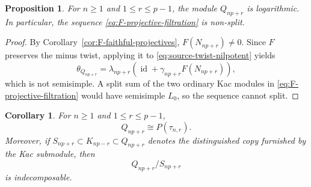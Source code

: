 \documentclass[12pt,leqno]{amsart}
\numberwithin{equation}{section}
\newtheorem{prop}[thm]{Proposition}
\newtheorem{cor}[thm]{Corollary}
\newcommand{\id}{\operatorname{id}}
\begin{document}
\begin{prop}\label{prop:Q-logarithmic}
For $n\geq1$ and $1\leq r\leq p-1$, the module $Q_{np+r}$ is logarithmic.
In particular, the sequence \eqref{eq:F-projective-filtration} is non-split.
\end{prop}

\begin{proof}
By Corollary~\ref{cor:F-faithful-projectives},
$F(N_{np+r})\neq0$.  Since $F$ preserves the minus twist, applying it to
\eqref{eq:source-twist-nilpotent} yields
\[
 \theta_{Q_{np+r}}=
 \lambda_{np+r}(\id+\gamma_{np+r}F(N_{np+r})),
\]
which is not semisimple.  A split sum of the two ordinary Kac modules in
\eqref{eq:F-projective-filtration} would have semisimple $L_0$, so the
sequence cannot split.
\end{proof}

\begin{cor}\label{cor:Q-Ptau}
For $n\geq1$ and $1\leq r\leq p-1$,
\[
 Q_{np+r}\cong P(\tau_{n,r}).
\]
Moreover, if $S_{np+r}\subset K_{np-r}\subset Q_{np+r}$ denotes the
distinguished copy furnished by the Kac submodule, then
\[
 Q_{np+r}/S_{np+r}
\]
is indecomposable.
\end{cor}
\end{document}
